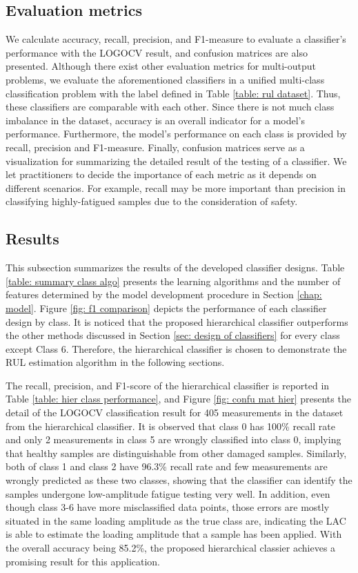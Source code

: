 \subsection{Evaluation metrics}
We calculate accuracy, recall, precision, and F1-measure to evaluate a classifier's performance with the LOGOCV result, and confusion matrices are also presented. Although there exist other evaluation metrics for multi-output problems, we evaluate the aforementioned classifiers in a unified multi-class classification problem with the label defined in Table \ref{table: rul dataset}. Thus, these classifiers are comparable with each other. Since there is not much class imbalance in the dataset, accuracy is an overall indicator for a model's performance. Furthermore, the model's performance on each class is provided by recall, precision and F1-measure. Finally, confusion matrices serve as a visualization for summarizing the detailed result of the testing of a classifier. We let practitioners to decide the importance of each metric as it depends on different scenarios. For example, recall may be more important than precision in classifying highly-fatigued samples due to the consideration of safety.

\subsection{Results}
This subsection summarizes the results of the developed classifier designs. Table \ref{table: summary class algo} presents the learning algorithms and the number of features determined by the model development procedure in Section \ref{chap: model}. Figure \ref{fig: f1 comparison} depicts the performance of each classifier design by class. It is noticed that the proposed hierarchical classifier outperforms the other methods discussed in Section \ref{sec: design of classifiers} for every class except Class 6. Therefore, the hierarchical classifier is chosen to demonstrate the RUL estimation algorithm in the following sections.

The recall, precision, and F1-score of the hierarchical classifier is reported in Table \ref{table: hier class performance}, and Figure \ref{fig: confu mat hier} presents the detail of the LOGOCV classification result for 405 measurements in the dataset from the hierarchical classifier. It is observed that class 0 has 100\% recall rate and only 2 measurements in class 5 are wrongly classified into class 0, implying that healthy samples are distinguishable from other damaged samples. Similarly, both of class 1 and class 2 have 96.3\% recall rate and few measurements are wrongly predicted as these two classes, showing that the classifier can identify the samples undergone low-amplitude fatigue testing very well. In addition, even though class 3-6 have more misclassified data points, those errors are mostly situated in the same loading amplitude as the true class are, indicating the LAC is able to estimate the loading amplitude that a sample has been applied. With the overall accuracy being 85.2\%, the proposed hierarchical classier achieves a promising result for this application.

